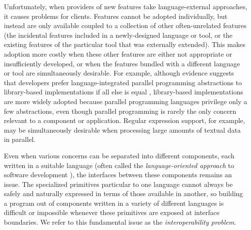 Unfortunately, when providers of new features take language-external approaches, it causes problems for clients. Features cannot be adopted individually, but instead are only available coupled to a collection of other often-unrelated  features (the incidental features included in a newly-designed language or tool, or the existing features of the particular tool that was externally extended). This makes adoption more costly when these other features are either not appropriate or insufficiently developed, or when the features bundled with a different language or tool are simultaneously desirable. For example, although evidence suggests that developers prefer language-integrated parallel programming abstractions to library-based implementations if all else is equal \cite{langvslib}, library-based implementations are more widely adopted because parallel programming languages privilege only a few abstractions, even though parallel programming is rarely the only concern relevant to a component or application. Regular expression support, for example, may be simultaneously desirable when processing large amounts of textual data in parallel. %



Even when various concerns can be separated into different components, each written in a suitable language (often called the \emph{language-oriented approach} to software development \cite{language-oriented}), the interfaces between these components remains an issue. The specialized primitives particular to one language cannot always be safely and naturally expressed in terms of those available in another, so building a program out of components written in a variety of different languages is difficult or impossible whenever these primitives are exposed at interface boundaries. We refer to this fundamental issue as the \emph{interoperability problem}. 

